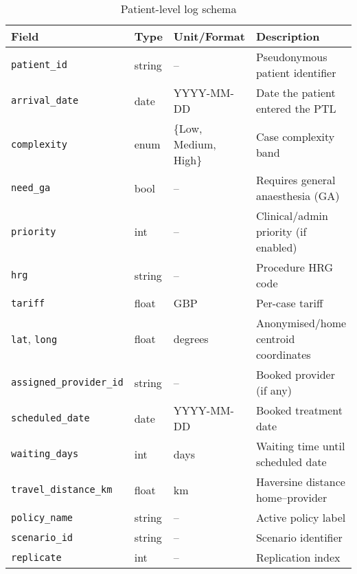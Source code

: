 \documentclass[ %
                    author={Nattanan Nawakitbamrung},
                supervisor={Dr. Sébastien Rochat},
                    degree={MSc},
                     title={Developing and Evaluating the Impact of a Single Patient Treatment List (PTL) for an NHS Integrated Care System},
                  subtitle={},
                      type={},
                      year={2025}]{dissertation}
\begin{document}
\clearpage
\begin{table}[htbp]
\small
\centering
\begin{tabularx}{\linewidth}{@{} l l l Y @{}}
\toprule
\textbf{Field} & \textbf{Type} & \textbf{Unit/Format} & \textbf{Description} \\
\midrule
\texttt{patient\_id} & string & – & Pseudonymous patient identifier \\
\texttt{arrival\_date} & date & YYYY-MM-DD & Date the patient entered the PTL \\
\texttt{complexity} & enum & \{Low, Medium, High\} & Case complexity band \\
\texttt{need\_ga} & bool & – & Requires general anaesthesia (GA) \\
\texttt{priority} & int & – & Clinical/admin priority (if enabled) \\
\texttt{hrg} & string & – & Procedure HRG code \\
\texttt{tariff} & float & GBP & Per-case tariff \\
\texttt{lat}, \texttt{long} & float & degrees & Anonymised/home centroid coordinates \\
\texttt{assigned\_provider\_id} & string & – & Booked provider (if any) \\
\texttt{scheduled\_date} & date & YYYY-MM-DD & Booked treatment date \\
\texttt{waiting\_days} & int & days & Waiting time until scheduled date \\
\texttt{travel\_distance\_km} & float & km & Haversine distance home–provider \\
\texttt{policy\_name} & string & – & Active policy label \\
\texttt{scenario\_id} & string & – & Scenario identifier \\
\texttt{replicate} & int & – & Replication index \\
\bottomrule
\end{tabularx}
\caption{Patient-level log schema}
\label{tab:log-patient}
\end{table}
\end{document}
